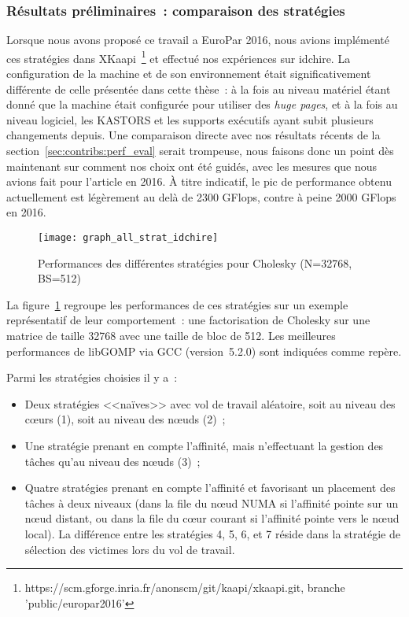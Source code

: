 \subsubsection{Résultats préliminaires~: comparaison des stratégies}
\label{sec:openmp:runtime:preliminary_results}

Lorsque nous avons proposé ce travail a EuroPar 2016, nous avions implémenté ces stratégies dans XKaapi~\footnote{https://scm.gforge.inria.fr/anonscm/git/kaapi/xkaapi.git, branche 'public/europar2016'} et effectué nos expériences sur idchire.
La configuration de la machine et de son environnement était significativement différente de celle présentée dans cette thèse~: à la fois au niveau matériel étant donné que la machine était configurée pour utiliser des \emph{huge pages}, et à la fois au niveau logiciel, les KASTORS et les supports exécutifs ayant subit plusieurs changements depuis.
Une comparaison directe avec nos résultats récents de la section~\ref{sec:contribs:perf_eval} serait trompeuse, nous faisons donc un point dès maintenant sur comment nos choix ont été guidés, avec les mesures que nous avions fait pour l'article en 2016. À titre indicatif, le pic de performance obtenu actuellement est légèrement au delà de 2300 GFlops, contre à peine 2000 GFlops en 2016.

\begin{figure}[ht]
  \centering
  \texttt{[image: graph\_all\_strat\_idchire]}
  \caption{Performances des différentes stratégies pour Cholesky (N=32768, BS=512)}\label{fig:contribs:perf_eval:eval-strategies}
\end{figure}

La figure~\ref{fig:contribs:perf_eval:eval-strategies} regroupe les performances de ces stratégies sur un exemple représentatif de leur comportement~: une factorisation de Cholesky sur une matrice de taille 32768 avec une taille de bloc de 512.
Les meilleures performances de libGOMP via GCC (version~5.2.0) sont indiquées comme repère.

Parmi les stratégies choisies il y a~:
\begin{itemize}
  \item Deux stratégies <<naïves>> avec vol de travail aléatoire, soit au niveau des cœurs (1), soit au niveau des nœuds (2)~;
  \item Une stratégie prenant en compte l'affinité, mais n'effectuant la gestion des tâches qu'au niveau des nœuds (3)~;
  \item Quatre stratégies prenant en compte l'affinité et favorisant un placement des tâches à deux niveaux (dans la file du nœud NUMA si l'affinité pointe sur un nœud distant, ou dans la file du cœur courant si l'affinité pointe vers le nœud local). La différence entre les stratégies 4, 5, 6, et 7 réside dans la stratégie de sélection des victimes lors du vol de travail.
\end{itemize}

